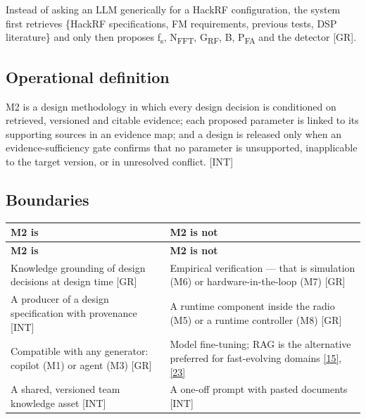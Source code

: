 \documentclass[11pt,a4paper]{article}
\newcommand{\prov}[1]{\textsf{\footnotesize[#1]}}
\begin{document}
Instead of asking an LLM generically for a HackRF configuration, the system first retrieves \{HackRF specifications, FM requirements, previous tests, DSP literature\} and only then proposes f\textsubscript{s}, N\textsubscript{FFT}, G\textsubscript{RF}, B, P\textsubscript{FA} and the detector \prov{GR}.

\subsection{Operational definition}
\begin{notebox}
M2 is a design methodology in which every design decision is conditioned on retrieved, versioned and citable evidence; each proposed parameter is linked to its supporting sources in an evidence map; and a design is released only when an evidence-sufficiency gate confirms that no parameter is unsupported, inapplicable to the target version, or in unresolved conflict. \prov{INT}
\end{notebox}
\subsection{Boundaries}
{\small
\begin{longtable}{>{\raggedright\arraybackslash}p{}>{\raggedright\arraybackslash}p{}}
\toprule
\rowcolor{headbg} \textbf{M2 is} & \textbf{M2 is not} \\
\midrule
\endfirsthead
\toprule
\rowcolor{headbg} \textbf{M2 is} & \textbf{M2 is not} \\
\midrule
\endhead
\bottomrule
\endlastfoot
Knowledge grounding of design decisions at design time \prov{GR} & Empirical verification --- that is simulation (M6) or hardware-in-the-loop (M7) \prov{GR} \\ \arrayrulecolor{rulec}\hline\arrayrulecolor{black}
A producer of a design specification with provenance \prov{INT} & A runtime component inside the radio (M5) or a runtime controller (M8) \prov{GR} \\ \arrayrulecolor{rulec}\hline\arrayrulecolor{black}
Compatible with any generator: copilot (M1) or agent (M3) \prov{GR} & Model fine-tuning; RAG is the alternative preferred for fast-evolving domains \hyperlink{ref15}{[15]}, \hyperlink{ref23}{[23]} \\ \arrayrulecolor{rulec}\hline\arrayrulecolor{black}
A shared, versioned team knowledge asset \prov{INT} & A one-off prompt with pasted documents \prov{INT} \\
\end{longtable}
}
\end{document}
